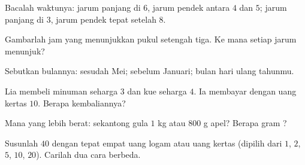 \begin{exercise}[$\star$]\label{exo:g2:measure:5}
Bacalah waktunya: jarum panjang di $6$, jarum pendek antara $4$ dan
$5$; jarum panjang di $3$, jarum pendek tepat setelah $8$.
\end{exercise}

\begin{exercise}[$\star$]\label{exo:g2:measure:6}
Gambarlah jam yang menunjukkan pukul setengah tiga. Ke mana setiap jarum menunjuk?
\end{exercise}

\begin{exercise}[$\star$]\label{exo:g2:measure:7}
Sebutkan bulannya: sesudah Mei; sebelum Januari; bulan hari ulang
tahunmu.
\end{exercise}

\begin{exercise}[$\star$]\label{exo:g2:measure:8}
Lia membeli minuman seharga $3$ dan kue seharga $4$. Ia membayar
dengan uang kertas $10$. Berapa kembaliannya?
\end{exercise}

\begin{exercise}[$\star$]\label{exo:g2:measure:9}
Mana yang lebih berat: sekantong gula $1$ kg atau $800$ g apel?
Berapa gram ?
\end{exercise}

\begin{exercise}[$\star\star$]\label{exo:g2:measure:10}
Susunlah $40$ dengan tepat empat uang logam atau uang kertas
(dipilih dari $1$, $2$, $5$, $10$, $20$). Carilah dua cara berbeda.

\end{exercise}
